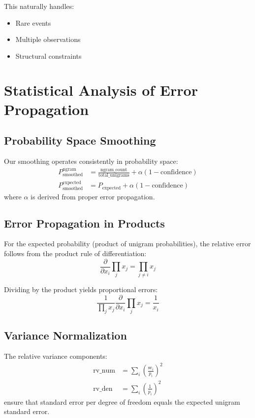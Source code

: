 \documentclass[12pt,a4paper]{article}
\begin{document}
This naturally handles:
\begin{itemize}
    \item Rare events
    \item Multiple observations
    \item Structural constraints
\end{itemize}





\section{Statistical Analysis of Error Propagation}

\subsection{Probability Space Smoothing}
Our smoothing operates consistently in probability space:
\begin{align}
    P_{\text{smoothed}}^{\text{ngram}} &= \frac{\text{ngram\_count}}{\text{total\_unigrams}} + \alpha(1 - \text{confidence}) \\
    P_{\text{smoothed}}^{\text{expected}} &= P_{\text{expected}} + \alpha(1 - \text{confidence})
\end{align}
where $\alpha$ is derived from proper error propagation.

\subsection{Error Propagation in Products}
For the expected probability (product of unigram probabilities), the relative error follows from the product rule of differentiation:
\begin{equation}
    \frac{\partial}{\partial x_i} \prod_j x_j = \prod_{j \neq i} x_j
\end{equation}

Dividing by the product yields proportional errors:
\begin{equation}
    \frac{1}{\prod_j x_j} \frac{\partial}{\partial x_i} \prod_j x_j = \frac{1}{x_i}
\end{equation}

\subsection{Variance Normalization}
The relative variance components:
\begin{align}
    \text{rv\_num} &= \sum_i \left(\frac{\text{se}_i}{p_i}\right)^2 \\
    \text{rv\_den} &= \sum_i \left(\frac{1}{p_i}\right)^2
\end{align}
ensure that standard error per degree of freedom equals the expected unigram standard error.
\end{document}
